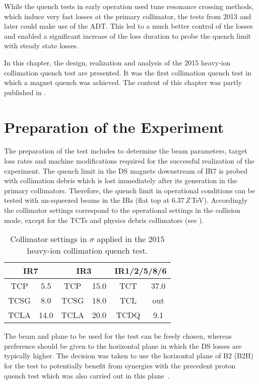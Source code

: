 While the quench tests in early operation used tune resonance crossing methods, which induce very fast losses at the primary collimator, the tests from 2013 and later could make use of the ADT. This led to a much better control of the losses and enabled a significant increase of the loss duration to probe the quench limit with steady state losses. 

In this chapter, the design, realization and analysis of the 2015 heavy-ion collimation quench test are presented. It was the first collimation quench test in which a magnet quench was achieved. The content of this chapter was partly published in \cite{ACC-NOTE-16-0031}.

\section{Preparation of the Experiment}

The preparation of the test includes to determine the beam parameters, target loss rates and machine modifications required for the successful realization of the experiment. The quench limit in the DS magnets downstream of IR7 is probed with collimation debris which is lost immediately after its generation in the primary collimators. Therefore, the quench limit in operational conditions can be tested with un-squeezed beams in the IRs (flat top at 6.37\,$Z$\,TeV). Accordingly the collimator settings correspond to the operational settings in the collision mode, except for the TCTs and physics debris collimators (see ). 

\begin{table}[b]
\centering
\caption{Collimator settings in $\sigma$ applied in the 2015 heavy-ion collimation quench test.}
\label{tab:sets_qt}
\begin{tabular}{cccccc} 
\toprule
\multicolumn{2}{c}{IR7}    &          \multicolumn{2}{c}{IR3}          &    \multicolumn{2}{c}{IR1/2/5/8/6} \\ \midrule
TCP    &  5.5  &   TCP   &  15.0    &    TCT  &   37.0 \\ 
TCSG   &  8.0  &   TCSG  &  18.0    &    TCL  &   out  \\
TCLA   & 14.0  &   TCLA  &  20.0    &   TCDQ  &   9.1  \\ \bottomrule
\end{tabular}
\end{table}

The beam and plane to be used for the test can be freely chosen, whereas preference should be given to the horizontal plane in which the DS losses are typically higher. The decision was taken to use the horizontal plane of B2 (B2H) for the test to potentially benefit from synergies with the precedent proton quench test which was also carried out in this plane~\cite{CERN-ACC-NOTE-2016-0015}. 


